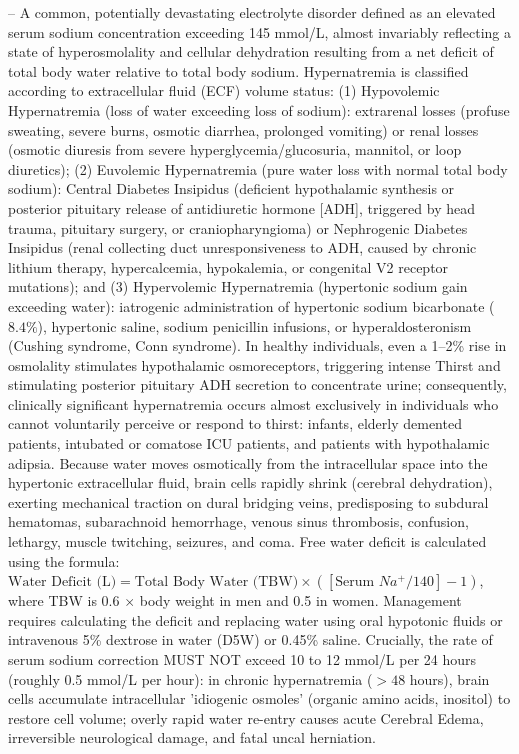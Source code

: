 -- A common, potentially devastating electrolyte disorder defined as an elevated serum sodium concentration exceeding 145 mmol/L, almost invariably reflecting a state of hyperosmolality and cellular dehydration resulting from a net deficit of total body water relative to total body sodium. Hypernatremia is classified according to extracellular fluid (ECF) volume status: (1) Hypovolemic Hypernatremia (loss of water exceeding loss of sodium): extrarenal losses (profuse sweating, severe burns, osmotic diarrhea, prolonged vomiting) or renal losses (osmotic diuresis from severe hyperglycemia/glucosuria, mannitol, or loop diuretics); (2) Euvolemic Hypernatremia (pure water loss with normal total body sodium): Central Diabetes Insipidus (deficient hypothalamic synthesis or posterior pituitary release of antidiuretic hormone [ADH], triggered by head trauma, pituitary surgery, or craniopharyngioma) or Nephrogenic Diabetes Insipidus (renal collecting duct unresponsiveness to ADH, caused by chronic lithium therapy, hypercalcemia, hypokalemia, or congenital V2 receptor mutations); and (3) Hypervolemic Hypernatremia (hypertonic sodium gain exceeding water): iatrogenic administration of hypertonic sodium bicarbonate ($8.4\%$), hypertonic saline, sodium penicillin infusions, or hyperaldosteronism (Cushing syndrome, Conn syndrome). In healthy individuals, even a 1--2\% rise in osmolality stimulates hypothalamic osmoreceptors, triggering intense Thirst and stimulating posterior pituitary ADH secretion to concentrate urine; consequently, clinically significant hypernatremia occurs almost exclusively in individuals who cannot voluntarily perceive or respond to thirst: infants, elderly demented patients, intubated or comatose ICU patients, and patients with hypothalamic adipsia. Because water moves osmotically from the intracellular space into the hypertonic extracellular fluid, brain cells rapidly shrink (cerebral dehydration), exerting mechanical traction on dural bridging veins, predisposing to subdural hematomas, subarachnoid hemorrhage, venous sinus thrombosis, confusion, lethargy, muscle twitching, seizures, and coma. Free water deficit is calculated using the formula: $\text{Water Deficit (L)} = \text{Total Body Water (TBW)} \times ([\text{Serum } Na^+/140] - 1)$, where TBW is 0.6 $\times$ body weight in men and 0.5 in women. Management requires calculating the deficit and replacing water using oral hypotonic fluids or intravenous 5\% dextrose in water (D5W) or 0.45\% saline. Crucially, the rate of serum sodium correction MUST NOT exceed 10 to 12 mmol/L per 24 hours (roughly 0.5 mmol/L per hour): in chronic hypernatremia ($>48$ hours), brain cells accumulate intracellular 'idiogenic osmoles' (organic amino acids, inositol) to restore cell volume; overly rapid water re-entry causes acute Cerebral Edema, irreversible neurological damage, and fatal uncal herniation.

